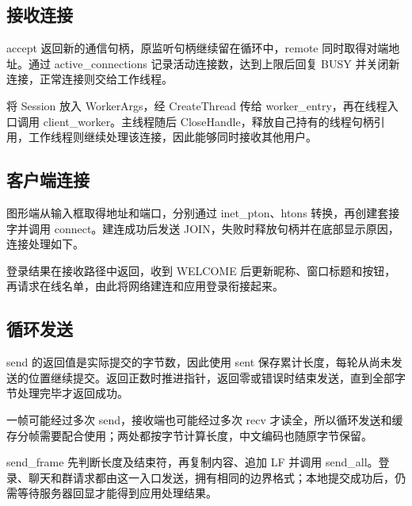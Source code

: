 \documentclass[UTF8,a4paper,10pt,fontset=fandol]{ctexart}
\begin{document}
\subsection{接收连接}
accept 返回新的通信句柄，原监听句柄继续留在循环中，remote 同时取得对端地址。通过 active\_connections 记录活动连接数，达到上限后回复 BUSY 并关闭新连接，正常连接则交给工作线程。

\medskip
将 Session 放入 WorkerArgs，经 CreateThread 传给 worker\_entry，再在线程入口调用 client\_worker。主线程随后 CloseHandle，释放自己持有的线程句柄引用，工作线程则继续处理该连接，因此能够同时接收其他用户。

\subsection{客户端连接}
图形端从输入框取得地址和端口，分别通过 inet\_pton、htons 转换，再创建套接字并调用 connect。建连成功后发送 JOIN，失败时释放句柄并在底部显示原因，连接处理如下。

\medskip
登录结果在接收路径中返回，收到 WELCOME 后更新昵称、窗口标题和按钮，再请求在线名单，由此将网络建连和应用登录衔接起来。

\subsection{循环发送}
send 的返回值是实际提交的字节数，因此使用 sent 保存累计长度，每轮从尚未发送的位置继续提交。返回正数时推进指针，返回零或错误时结束发送，直到全部字节处理完毕才返回成功。

\medskip
一帧可能经过多次 send，接收端也可能经过多次 recv 才读全，所以循环发送和缓存分帧需要配合使用；两处都按字节计算长度，中文编码也随原字节保留。

send\_frame 先判断长度及结束符，再复制内容、追加 LF 并调用 send\_all。登录、聊天和群请求都由这一入口发送，拥有相同的边界格式；本地提交成功后，仍需等待服务器回显才能得到应用处理结果。

\medskip
\end{document}
